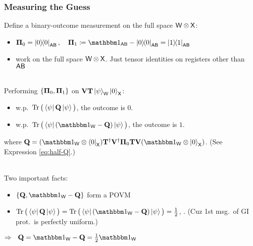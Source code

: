 \documentclass[aspectratio=1610, 12pt, xcolor={dvipsnames}]{beamer}
\begin{document}
\begin{frame}
\frametitle{Measuring the Guess}

Define a binary-outcome measurement on the full space $\reg{w}\tensor\reg{x}$: 
\begin{itemize}
\item $\vb{\Pi}_0 = \ketbra{0}_\reg{ab}, ~~~ \vb{\Pi}_1 \coloneqq \idm_\reg{ab} - \ketbra{0}_\reg{ab} = \ketbra{1}_\reg{ab}$
\item 
work on the full space $\reg{w}\tensor\reg{x}$. Just tensor identities on registers other than $\reg{ab}$
\end{itemize}
~\\


Performing $\{\vb{\Pi}_0, \vb{\Pi}_1\}$ on $\vb{V}\vb{T}\ket{\psi}_\reg{w}\ket{0}_\reg{x}$:
\begin{itemize}
\item w.p.\ 
$\Tr\big(\bra{\psi}\vb{Q} \ket{\psi}\big)$, the outcome is $0$.
\item w.p.\  
$\Tr\big(\bra{\psi}( \idm_\reg{w}- \vb{Q} )\ket{\psi}\big)$, the outcome is $1$.
\end{itemize}
where $\vb{Q}	 = (\idm_\reg{w} \tensor \bra{0}_\reg{x}) \vb{T}^\dagger \vb{V}^\dagger \vb{\Pi}_0 \vb{T} \vb{V} (\idm_\reg{w} \tensor \ket{0}_\reg{x})$. (See Expression \eqref{eq:half-Q}.)
\\~

Two important facts:
\begin{itemize}
\item $\Set{\vb{Q}, \idm_\reg{w}- \vb{Q}}$ form a POVM
\item
$\Tr\big(\bra{\psi}\vb{Q} \ket{\psi}\big) = \Tr\big(\bra{\psi}( \idm_\reg{w}- \vb{Q} )\ket{\psi}\big) = \frac{1}{2}$, . (Cuz 1st msg.\ of GI prot.\ is perfectly uniform.)
\end{itemize}
$\Rightarrow ~~ \vb{Q}  = \idm_\reg{w}- \vb{Q} = \frac{1}{2}\idm_\reg{w}$
\end{frame}
\end{document}
